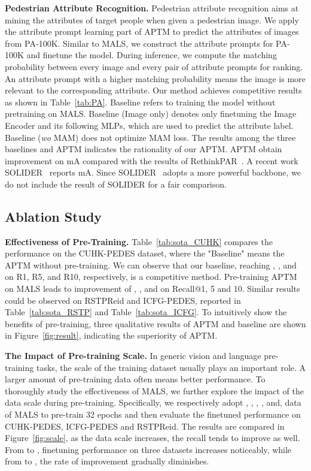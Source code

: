 \documentclass[sigconf]{acmart}
\begin{document}
\noindent\textbf{Pedestrian Attribute Recognition.}
Pedestrian attribute recognition aims at mining the attributes of target people when given a pedestrian image. We apply the attribute prompt learning part of APTM to predict the attributes of images from PA-100K. Similar to MALS, we construct the attribute prompts for PA-100K and finetune the model.
During inference, we compute the matching probability between every image and every pair of attribute prompts for ranking.
An attribute prompt with a higher matching probability means the image is more relevant to the corresponding attribute.
Our method achieves competitive results as shown in Table~\ref{tab:PA}.
Baseline refers to training the model without pretraining on MALS.
Baseline (Image only) denotes only finetuning the Image Encoder and its following MLPs, which are used to predict the attribute label. 
Baseline (\emph{wo} MAM) does not optimize MAM loss.
The results among the three baselines and APTM indicates the rationality of our APTM.
APTM obtain  improvement on mA compared with the results of RethinkPAR~\cite{jia2021rethinking}. 
A recent work SOLIDER~\cite{chen2023beyond} reports  mA. Since SOLIDER~\cite{chen2023beyond} adopts a more powerful backbone, we do not include the result of SOLIDER for a fair comparison. 


\subsection{Ablation Study} 


\noindent\textbf{Effectiveness of Pre-Training.} 
Table~\ref{tab:sota_CUHK} compares the performance on the CUHK-PEDES dataset, where the "Baseline" means the APTM without pre-training. We can observe that our baseline, reaching , , and  on R1, R5, and R10, respectively, is a competitive method. Pre-training APTM on MALS leads to improvement of , , and  on Recall@1, 5 and 10. Similar results could be observed on RSTPReid and ICFG-PEDES, reported in Table~\ref{tab:sota_RSTP} and Table~\ref{tab:sota_ICFG}. 
To intuitively show the benefits of pre-training, three qualitative results of APTM and baseline are shown in Figure~\ref{fig:result}, indicating the superiority of APTM.


\noindent\textbf{The Impact of Pre-training Scale.} 
In generic vision and language pre-training tasks, the scale of the training dataset usually plays an important role. A larger amount of pre-training data often means better performance.
To thoroughly study the effectiveness of MALS, we further explore the impact of the data scale during pre-training. Specifically, we respectively adopt , , , ,  and,  data of MALS to pre-train 32 epochs and then evaluate the finetuned performance on CUHK-PEDES, ICFG-PEDES and RSTPReid.
The results are compared in Figure~\ref{fig:scale}, as the data scale increases, the recall tends to improve as well. From  to , finetuning performance on three datasets increases noticeably, while from  to , the rate of improvement gradually diminishes.
\end{document}
